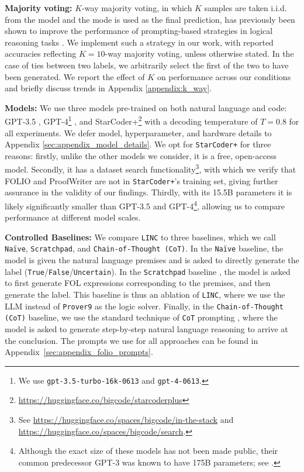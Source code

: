 \documentclass[11pt]{article}
\begin{document}
\textbf{Majority voting:} $K$-way majority voting, in which $K$ samples are taken i.i.d. from the model and the mode is used as the final prediction, has previously been shown to improve the performance of prompting-based strategies in logical reasoning tasks \cite{wang2022self}.
We implement such a strategy in our work, with reported accuracies reflecting $K=10$-way majority voting, unless otherwise stated.
In the case of ties between two labels, we arbitrarily select the first of the two to have been generated.
We report the effect of $K$ on performance across our conditions and briefly discuss trends in Appendix \ref{appendix:k_way}.

\textbf{Models:}
We use three models pre-trained on both natural language and code: GPT-3.5 \citep{ouyang2022training}, GPT-4\footnote{We use \texttt{gpt-3.5-turbo-16k-0613} and \texttt{gpt-4-0613}.} \citep{openai2023gpt4}, and StarCoder+\footnote{\url{https://huggingface.co/bigcode/starcoderplus}} \citep{li2023starcoder} with a decoding temperature of $T=0.8$ for all experiments. We defer model, hyperparameter, and hardware details to Appendix \ref{sec:appendix_model_details}.
We opt for \texttt{StarCoder+} for three reasons: firstly, unlike the other models we consider, it is a free, open-access model. Secondly, it has a dataset search functionality\footnote{See \url{https://huggingface.co/spaces/bigcode/in-the-stack} and \url{https://huggingface.co/spaces/bigcode/search}.}, with which we verify that FOLIO and ProofWriter are not in \texttt{StarCoder+}'s training set, giving further assurance in the validity of our findings. Thirdly, with its 15.5B parameters it is likely significantly smaller than GPT-3.5 and GPT-4\footnote{Although the exact size of these models has not been made public, their common predecessor GPT-3 was known to have 175B parameters; see \citet{brown2020gpt3}.}, allowing us to compare performance at different model scales.

\textbf{Controlled Baselines:}
\label{sec:controlled-baselines}
We compare \texttt{LINC} to three baselines, which we call \texttt{Na\"ive}, \texttt{Scratchpad}, and \texttt{Chain-of-Thought (CoT)}.
In the \texttt{Na\"ive} baseline, the model is given the natural language premises and is asked to directly generate the label (\texttt{True}/\texttt{False}/\texttt{Uncertain}).
In the \texttt{Scratchpad} baseline \cite{nye2021show}, the model is asked to first generate FOL expressions corresponding to the premises, and then generate the label.
This baseline is thus an ablation of \texttt{LINC}, where we use the LLM instead of \texttt{Prover9} as the logic solver.
Finally, in the \texttt{Chain-of-Thought (CoT)} baseline, we use the standard technique of \texttt{CoT} prompting \cite{wei2022chain,kojima2022large,wang2022self}, where the model is asked to generate step-by-step natural language reasoning to arrive at the conclusion.
The prompts we use for all approaches can be found in Appendix~\ref{sec:appendix_folio_prompts}.
\end{document}
